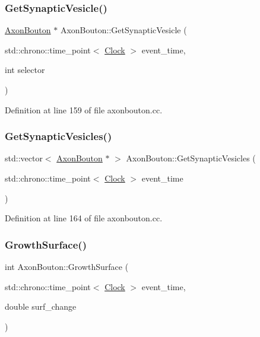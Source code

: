 \subsubsection{\texorpdfstring{Get\+Synaptic\+Vesicle()}{GetSynapticVesicle()}}
{\footnotesize\ttfamily \mbox{\hyperlink{class_axon_bouton}{Axon\+Bouton}} $\ast$ Axon\+Bouton\+::\+Get\+Synaptic\+Vesicle (\begin{DoxyParamCaption}\item[{std\+::chrono\+::time\+\_\+point$<$ \mbox{\hyperlink{universe_8h_a0ef8d951d1ca5ab3cfaf7ab4c7a6fd80}{Clock}} $>$}]{event\+\_\+time,  }\item[{int}]{selector }\end{DoxyParamCaption})}



Definition at line 159 of file axonbouton.\+cc.

\mbox{\label{class_axon_bouton_af9a35ff7a6c32ac291021cccb3d40c9b}} 
\subsubsection{\texorpdfstring{Get\+Synaptic\+Vesicles()}{GetSynapticVesicles()}}
{\footnotesize\ttfamily std\+::vector$<$ \mbox{\hyperlink{class_axon_bouton}{Axon\+Bouton}} $\ast$ $>$ Axon\+Bouton\+::\+Get\+Synaptic\+Vesicles (\begin{DoxyParamCaption}\item[{std\+::chrono\+::time\+\_\+point$<$ \mbox{\hyperlink{universe_8h_a0ef8d951d1ca5ab3cfaf7ab4c7a6fd80}{Clock}} $>$}]{event\+\_\+time }\end{DoxyParamCaption})}



Definition at line 164 of file axonbouton.\+cc.

\mbox{\label{class_axon_bouton_a95fc006b2436e2c7784af2cc0bc9522e}} 
\subsubsection{\texorpdfstring{Growth\+Surface()}{GrowthSurface()}}
{\footnotesize\ttfamily int Axon\+Bouton\+::\+Growth\+Surface (\begin{DoxyParamCaption}\item[{std\+::chrono\+::time\+\_\+point$<$ \mbox{\hyperlink{universe_8h_a0ef8d951d1ca5ab3cfaf7ab4c7a6fd80}{Clock}} $>$}]{event\+\_\+time,  }\item[{double}]{surf\+\_\+change }\end{DoxyParamCaption})}




